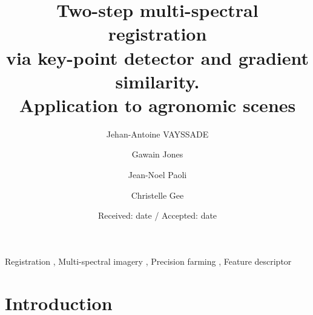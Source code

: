 \documentclass[]{elsarticle}
\begin{document}
	\begin{keyword}
		Registration \sep
		Multi-spectral imagery \sep
		Precision farming \sep
		Feature descriptor
	\end{keyword}
	
	\begin{frontmatter}
		\title{Two-step multi-spectral registration \\ via key-point detector and gradient similarity. \\ Application to agronomic scenes}
		\author[unilu]{Jehan-Antoine VAYSSADE} 
		\author[unilu]{Gawain Jones} 
		\author[unilu]{Jean-Noel Paoli} 
		\author[unilu]{Christelle Gee} 
		\address[myuni]{Agroécologie, AgroSup Dijon, INRA, Univ. Bourgogne, Univ. Bourgogne Franche-Comté, F-21000 Dijon, France}
		\date{Received: date / Accepted: date}
	\end{frontmatter}
	
	\newpage
	
	\section{Introduction}
	
\end{document}
